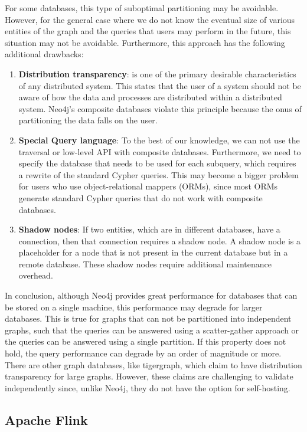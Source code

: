 \smallskip
For some databases, this type of suboptimal
partitioning may be avoidable. However, for the general case where we do not
know the eventual size of various entities of the graph and the queries that 
users may perform in the future, this situation may not be avoidable. Furthermore, this
approach has the following additional drawbacks:
\begin{enumerate}
    \item \textbf{Distribution transparency}: is one of the primary desirable
        characteristics of any distributed system. This states that the user of a
        system should not be aware of how the data and processes are distributed
        within a distributed system. Neo4j's composite databases violate this
        principle because the onus of partitioning the data falls on the user.
    \item \textbf{Special Query language}: To the best of our knowledge, we can
        not use the traversal or low-level API with composite databases.
        Furthermore, we need to specify the database that needs to be used for
        each subquery, which requires a rewrite of the standard Cypher queries.
        This may become a bigger problem for users who use object-relational
        mappers (ORMs), since most ORMs generate standard Cypher queries that
        do not work with composite databases.
    \item \textbf{Shadow nodes}: If two entities, which are in different
        databases, have a connection, then that connection requires a shadow
        node. A shadow node is a placeholder for a node that is not
        present in the current database but in a remote database. These shadow
        nodes require additional maintenance overhead.
\end{enumerate}

\bigskip
In conclusion, although Neo4j provides great performance for databases that can
be stored on a single machine, this performance may degrade for larger
databases. This is true for graphs that can not be partitioned into independent
graphs, such that the queries can be answered using a scatter-gather
approach or the queries can be answered using a single partition. If this
property does not hold, the query performance can degrade by an order of
magnitude or more. There are other graph databases, like
tigergraph\cite{tigergraph}, which claim to have
distribution transparency for large graphs. However, these claims are
challenging
to validate independently since, unlike Neo4j, they do not have the option for
self-hosting.

\subsection{Apache Flink}\label{sec:flinkCmp}

